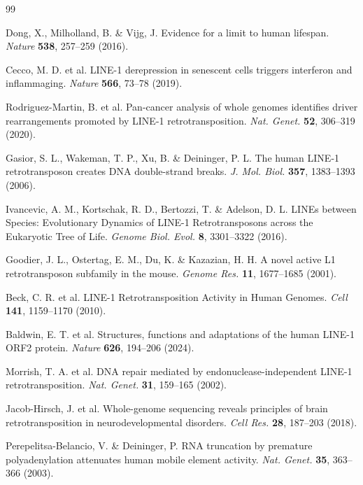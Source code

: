 \documentclass[11pt,twocolumn,twoside]{extarticle}
\begin{document}
\FloatBarrier
\begin{thebibliography}{99}
\footnotesize
\setlength{\itemsep}{0.12em}
\setlength{\parsep}{0pt}

 Dong, X., Milholland, B. \& Vijg, J. Evidence for a limit to human lifespan. \textit{Nature} \textbf{538}, 257--259 (2016).

 Cecco, M. D. et al. LINE-1 derepression in senescent cells triggers interferon and inflammaging. \textit{Nature} \textbf{566}, 73--78 (2019).

 Rodriguez-Martin, B. et al. Pan-cancer analysis of whole genomes identifies driver rearrangements promoted by LINE-1 retrotransposition. \textit{Nat. Genet.} \textbf{52}, 306--319 (2020).

 Gasior, S. L., Wakeman, T. P., Xu, B. \& Deininger, P. L. The human LINE-1 retrotransposon creates DNA double-strand breaks. \textit{J. Mol. Biol.} \textbf{357}, 1383--1393 (2006).

 Ivancevic, A. M., Kortschak, R. D., Bertozzi, T. \& Adelson, D. L. LINEs between Species: Evolutionary Dynamics of LINE-1 Retrotransposons across the Eukaryotic Tree of Life. \textit{Genome Biol. Evol.} \textbf{8}, 3301--3322 (2016).

 Goodier, J. L., Ostertag, E. M., Du, K. \& Kazazian, H. H. A novel active L1 retrotransposon subfamily in the mouse. \textit{Genome Res.} \textbf{11}, 1677--1685 (2001).

 Beck, C. R. et al. LINE-1 Retrotransposition Activity in Human Genomes. \textit{Cell} \textbf{141}, 1159--1170 (2010).

 Baldwin, E. T. et al. Structures, functions and adaptations of the human LINE-1 ORF2 protein. \textit{Nature} \textbf{626}, 194--206 (2024).

 Morrish, T. A. et al. DNA repair mediated by endonuclease-independent LINE-1 retrotransposition. \textit{Nat. Genet.} \textbf{31}, 159--165 (2002).

 Jacob-Hirsch, J. et al. Whole-genome sequencing reveals principles of brain retrotransposition in neurodevelopmental disorders. \textit{Cell Res.} \textbf{28}, 187--203 (2018).

 Perepelitsa-Belancio, V. \& Deininger, P. RNA truncation by premature polyadenylation attenuates human mobile element activity. \textit{Nat. Genet.} \textbf{35}, 363--366 (2003).


\end{thebibliography}
\end{document}
